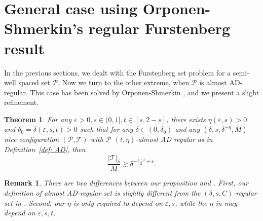 \documentclass{amsart}
\newtheorem{remark}[prop]{Remark}
\newtheorem{theorem}[prop]{Theorem}
\newtheorem{definition}[prop]{Definition}
\newcommand{\eps}{\varepsilon}
\newcommand{\cD}{\mathcal{D}}
\newcommand{\cT}{\mathcal{T}}
\newcommand{\cP}{\mathcal{P}}
\begin{document}
\section{General case using Orponen-Shmerkin's regular Furstenberg result}







In the previous sections, we dealt with the Furstenberg set problem for a semi-well spaced set $\cP$. Now we turn to the other extreme, when $\cP$ is almost AD-regular. This case has been solved by Orponen-Shmerkin \cite[Theorem 5.7]{orponen2023projections}, and we present a slight refinement.
\begin{theorem}\label{prop:furst-ADreg}
    For any $\eps > 0, s\in (0,1], t\in [s,2-s]$, there exists $\eta(\eps,s) > 0$ and $\delta_0=\delta(\eps,s,t)>0$ such that for any $\delta\in (0, \delta_0)$ and any $(\delta, s, \delta^{-\eta}, M)$-nice configuration $(\cP, \cT)$ with $\cP$ $(t, \eta)$-almost AD regular as in Definition~\ref{def: AD}, then
    \[
\frac{|\cT|_{\delta}}{M} \gtrsim \delta^{-\frac{s+t}{2}+\eps}.
\]  
\end{theorem}

\begin{remark}
    There are two differences between our proposition and \cite[Theorem 5.7]{orponen2023projections}. First, our definition of almost AD-regular set is slightly different from the $(\delta, s, C)$-regular set in \cite[Definition 4.2]{orponen2023projections}. Second, our $\eta$ is only required to depend on $\eps, s$, while the $\eta$ in \cite[Theorem 5.7]{orponen2023projections} may depend on $\eps, s, t$.
\end{remark}
\end{document}
